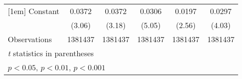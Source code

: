 {\begin{tabular}{l*{5}{c}}
[1em]
Constant            &      0.0372\sym{**} &      0.0372\sym{**} &      0.0306\sym{***}&      0.0197\sym{*}  &      0.0297\sym{***}\\
                    &      (3.06)         &      (3.18)         &      (5.05)         &      (2.56)         &      (4.03)         \\
\hline
Observations        &     1381437         &     1381437         &     1381437         &     1381437         &     1381437         \\
\hline\hline
\multicolumn{6}{l}{\footnotesize \textit{t} statistics in parentheses}\\
\multicolumn{6}{l}{\footnotesize \sym{*} \(p<0.05\), \sym{**} \(p<0.01\), \sym{***} \(p<0.001\)}\\
\end{tabular}
}
